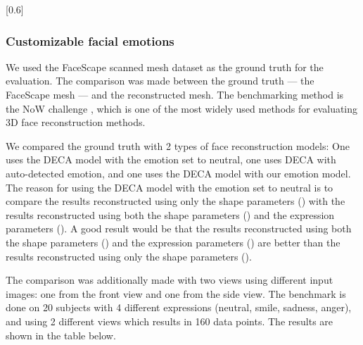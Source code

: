 [0.6]

\subsubsection{Customizable facial emotions}

We used the FaceScape scanned mesh dataset as the ground truth for the evaluation. The comparison was made between the ground truth --- the FaceScape mesh --- and the reconstructed mesh. The benchmarking method is the NoW challenge \cite{RingNet:CVPR:2019}, which is one of the most widely used methods for evaluating 3D face reconstruction methods.

We compared the ground truth with 2 types of face reconstruction models: One uses the DECA model with the emotion set to neutral, one uses DECA with auto-detected emotion, and one uses the DECA model with our emotion model. The reason for using the DECA model with the emotion set to neutral is to compare the results reconstructed using only the shape parameters (\beta) with the results reconstructed using both the shape parameters (\beta) and the expression parameters (\psi). A good result would be that the results reconstructed using both the shape parameters (\beta) and the expression parameters (\psi) are better than the results reconstructed using only the shape parameters (\beta).

The comparison was additionally made with two views using different input images: one from the front view and one from the side view. The benchmark is done on 20 subjects with 4 different expressions (neutral, smile, sadness, anger), and using 2 different views which results in 160 data points. The results are shown in the table below.

